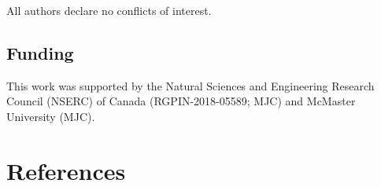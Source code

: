 \documentclass[
  man, donotrepeattitle,mask,floatsintext]{apa7}
\begin{document}
\noindent All authors declare no conflicts of interest.

\hypertarget{funding}{%
\subsection{Funding}\label{funding}}

\noindent This work was supported by the Natural Sciences and Engineering Research Council (NSERC) of Canada (RGPIN-2018-05589; MJC) and McMaster University (MJC).

\pagebreak

\hypertarget{references}{%
\section{References}\label{references}}

\vspace{2ex}
\end{document}
